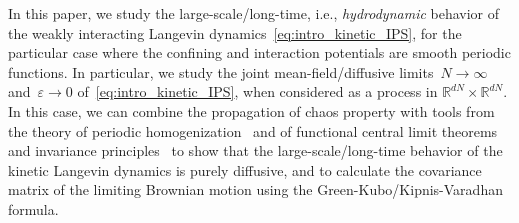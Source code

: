 \documentclass[onefignum,onetabnum]{siamart251216} %
\newcommand{\mc}[1]{\mathcal{#1}}
\newcommand{\eps}{\varepsilon}
\newcommand{\rg}[1]{\textcolor{rose}{\rm{[RG : #1]}}}
\theoremstyle{plain}
\numberwithin{equation}{section}
\numberwithin{theorem}{section}
\newcounter{ucounter}
\newcommand{\uv}[1]{
  \stepcounter{ucounter}
  \textcolor{orange}{
      \\[.2cm]
    U, comment \arabic{ucounter}. #1
    \\[.2cm]
  }
}
\renewcommand{\uv}[1]{\textcolor{orange}{#1}}
\begin{document}



In this paper, we study the large-scale/long-time, i.e., \emph{hydrodynamic} behavior of the weakly interacting Langevin dynamics~\eqref{eq:intro_kinetic_IPS}, for the particular case where the confining and interaction potentials are smooth periodic functions. In particular, we study the joint mean-field/diffusive limits~$N \to \infty$ and~$\eps \to 0$ of~\eqref{eq:intro_kinetic_IPS}, when considered as a process in $\mathbb{R}^{d N} \times \mathbb{R}^{d N}$. In this case, we can combine the propagation of chaos property with tools from the theory of periodic homogenization~\cite{PavlSt08} and of functional central limit theorems and invariance principles~\cite{komorowski2012fluctuations, de1989invariance} to show that the large-scale/long-time behavior of the kinetic Langevin dynamics is purely diffusive, and to calculate the covariance matrix of the limiting Brownian motion using the Green-Kubo/Kipnis-Varadhan formula.
\end{document}
